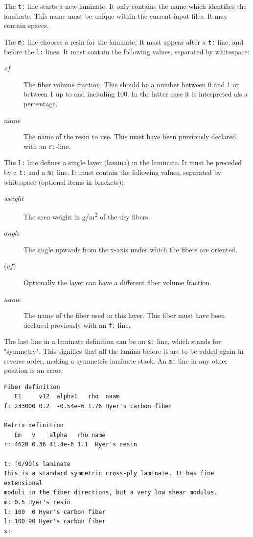 \documentclass[a4paper,landscape,oneside,11pt,twocolumn]{memoir}
\begin{document}
The \texttt{t:} line starts a new laminate. It only contains the name which
identifies the laminate. This name must be unique within the current input
files. It may contain spaces.

The \texttt{m:} line chooses a resin for the laminate. It must appear after
a \texttt{t:} line, and before the \texttt{l:} lines. It must contain the
following values, separated by whitespace:
\begin{description}
    \item[$vf$] The fiber volume fraction. This should be a number between
        0 and 1 or between 1 up to and including 100. In the latter case it
        is interpreted als a percentage.
    \item[$name$] The name of the resin to use. This must have been previously
        declared with an \texttt{r:}-line.
\end{description}

The \texttt{l:} line defines a single layer (lamina) in the laminate. It must be
preceded by a \texttt{t:} and a \texttt{m:} line. It must contain the following values,
separated by whitespace (optional items in brackets):
\begin{description}
    \item[$weight$] The area weight in \si{g/m^2} of the dry fibers.
    \item[$angle$] The angle upwards from the x-axis under which the fibers are oriented.
    \item[($vf$)] Optionally the layer can have a different fiber volume fraction.
    \item[$name$] The name of the fiber used in this layer. This fiber must have been
        declared previously with an \texttt{f:} line.
\end{description}

The last line in a laminate definition can be an \texttt{s:} line, which stands
for "symmetry". This signifies that all the lamina before it are to be added
again in reverse order, making a symmetric laminate stack. An \texttt{s:} line in any
other position is an error.

\begin{lstlisting}[style=plain]
Fiber definition
   E1     v12  alpha1   rho  naam
f: 233000 0.2  -0.54e-6 1.76 Hyer's carbon fiber

Matrix definition
   Em   v    alpha   rho name
r: 4620 0.36 41.4e-6 1.1  Hyer's resin

t: [0/90]s laminate
This is a standard symmetric cross-ply laminate. It has fine extensional
moduli in the fiber directions, but a very low shear modulus.
m: 0.5 Hyer's resin
l: 100  0 Hyer's carbon fiber
l: 100 90 Hyer's carbon fiber
s:
\end{lstlisting}
\end{document}
